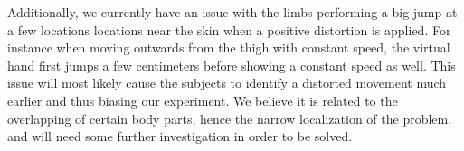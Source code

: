 Additionally, we currently have an issue with the limbs performing a big jump at a few locations locations near the skin when a positive distortion is applied. For instance when moving outwards from the thigh with constant speed, the virtual hand first jumps a few centimeters before showing a constant speed as well. This issue will most likely cause the subjects to identify a distorted movement much earlier and thus biasing our experiment. We believe it is related to the overlapping of certain body parts, hence the narrow localization of the problem, and will need some further investigation in order to be solved.
